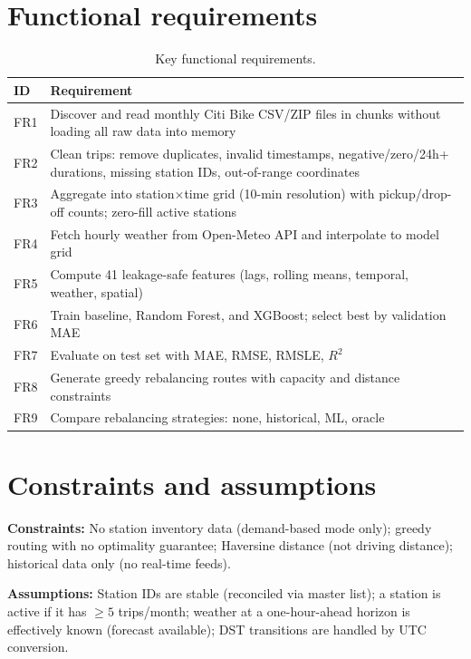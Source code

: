 \documentclass[12pt,a4paper]{report}
\begin{document}
\section{Functional requirements}

\begin{table}[H]
\centering
\caption{Key functional requirements.}
\label{tab:fr}
\small
\begin{tabular}{@{}p{0.4in}p{4.5in}@{}}
\toprule
\textbf{ID} & \textbf{Requirement} \\
\midrule
FR1 & Discover and read monthly Citi Bike CSV/ZIP files in chunks without loading all raw data into memory \\
FR2 & Clean trips: remove duplicates, invalid timestamps, negative/zero/24h+ durations, missing station IDs, out-of-range coordinates \\
FR3 & Aggregate into station$\times$time grid (10-min resolution) with pickup/drop-off counts; zero-fill active stations \\
FR4 & Fetch hourly weather from Open-Meteo API and interpolate to model grid \\
FR5 & Compute 41 leakage-safe features (lags, rolling means, temporal, weather, spatial) \\
FR6 & Train baseline, Random Forest, and XGBoost; select best by validation MAE \\
FR7 & Evaluate on test set with MAE, RMSE, RMSLE, $R^2$ \\
FR8 & Generate greedy rebalancing routes with capacity and distance constraints \\
FR9 & Compare rebalancing strategies: none, historical, ML, oracle \\
\bottomrule
\end{tabular}
\end{table}

\section{Constraints and assumptions}

\textbf{Constraints:} No station inventory data (demand-based mode
only); greedy routing with no optimality guarantee; Haversine
distance (not driving distance); historical data only (no
real-time feeds).

\textbf{Assumptions:} Station IDs are stable (reconciled via master
list); a station is active if it has $\geq 5$ trips/month; weather
at a one-hour-ahead horizon is effectively known (forecast
available); DST transitions are handled by UTC conversion.
\end{document}

